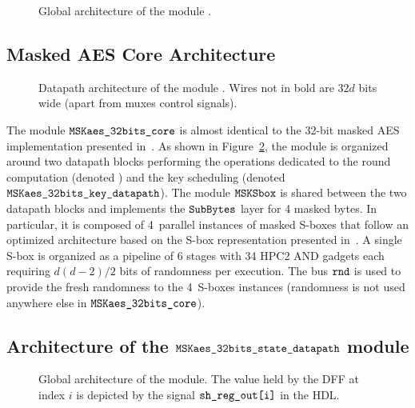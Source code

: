 \documentclass{scrartcl}
\begin{document}
\begin{figure}
    \centering
    \resizebox{\textwidth}{!}{
        \begin{tikzpicture}
            
        \end{tikzpicture}
    }
    \caption{Global architecture of the module \topName.}
    \label{fig:top_module_view}
\end{figure}

\subsection{Masked AES Core Architecture} 

\begin{figure}
    \centering
    \resizebox{\textwidth}{!}{
        \begin{tikzpicture}
            
        \end{tikzpicture}
    }
    \caption{Datapath architecture of the module \topModAES. Wires not in bold are $32d$ bits wide (apart from muxes control signals).}
    \label{fig:aes_glob_arch}
\end{figure}

The module $\texttt{MSKaes\_32bits\_core}$ is almost identical to the 32-bit masked AES implementation
presented in~\cite{DBLP:conf/cosade/MominCS22}. As shown in
Figure~\ref{fig:aes_glob_arch}, the module is organized around two datapath
blocks performing the operations dedicated to the round computation (denoted
\modAESdpState) and the key scheduling (denoted $\texttt{MSKaes\_32bits\_key\_datapath}$). The module
$\texttt{MSKSbox}$ is shared between the two datapath blocks and implements the $\texttt{SubBytes}$
layer for 4 masked bytes. In particular, it is composed of 4~parallel instances
of masked S-boxes that follow an optimized architecture based
on the S-box representation presented in~\cite{DBLP:conf/sec/BoyarP12}.
A single S-box is organized as a pipeline of 6 stages with 34 HPC2 AND gadgets
each requiring $d(d-2)/2$ bits of randomness per execution.
The bus
$\texttt{rnd}$ is used to provide the fresh randomness to the 4~S-boxes
instances (randomness is not used anywhere else in $\texttt{MSKaes\_32bits\_core}$).

\subsection{Architecture of the $\texttt{MSKaes\_32bits\_state\_datapath}$ module}
\label{sec:architecture}

\begin{figure}
    \centering
    \resizebox{\textwidth}{!}{
        \begin{tikzpicture}
            
        \end{tikzpicture}
    }
    \caption{Global architecture of the \modAESdpState module. The value held by the DFF at index $i$ is depicted by the signal $\texttt{sh\_reg\_out[i]}$ in the HDL.}
    \label{fig:aes_dpState}
\end{figure}
\end{document}
